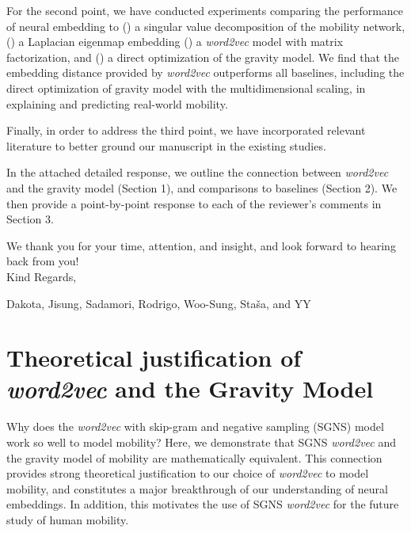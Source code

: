 \documentclass[12pt,draft,a4paper]{article}
\newcounter{comment}[subsection]
\begin{document}
For the second point, we have conducted experiments comparing the performance of neural embedding to () a singular value decomposition of the mobility network,  () a Laplacian eigenmap embedding  () a \textit{word2vec} model with matrix factorization,  and  () a direct optimization of the gravity model. We find that the embedding distance provided by \textit{word2vec} outperforms all baselines, including the direct optimization of gravity model with the multidimensional scaling, in explaining and predicting real-world mobility.

Finally, in order to address the third point, we have incorporated relevant literature to better ground our manuscript in the existing studies.

In the attached detailed response, we outline the connection between \textit{word2vec} and the gravity model (Section 1), and comparisons to baselines (Section 2). We then provide a point-by-point response to each of the reviewer's comments in Section 3.

We thank you for your time, attention, and insight, and look forward to hearing back from you!\\

Kind Regards,

Dakota, Jisung, Sadamori, Rodrigo, Woo-Sung, Staša, and YY

\clearpage
{}
\setcounter{page}{1}
\tableofcontents
\clearpage

\section{Theoretical justification of \textit{word2vec} and the Gravity Model}
\label{sec:theory}
\thispagestyle{empty}
Why does the \textit{word2vec} with skip-gram and negative sampling (SGNS) model work so well to model mobility?
Here, we demonstrate that SGNS {\it word2vec} and the gravity model of mobility are mathematically equivalent.
This connection provides strong theoretical justification to our choice of \textit{word2vec} to model mobility, and constitutes a major breakthrough of our understanding of neural embeddings.
In addition, this motivates the use of SGNS {\it word2vec} for the future study of human mobility.
\end{document}
